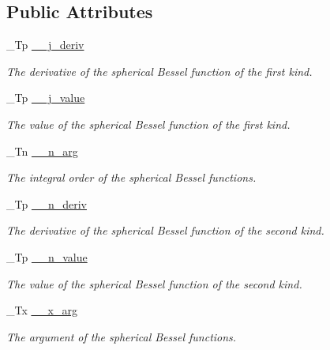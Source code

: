 \subsection*{Public Attributes}
\begin{DoxyCompactItemize}
\item 
\+\_\+\+Tp \hyperlink{struct____gnu__cxx_1_1____sph__bessel__t_af89f13e97d771e4cb18f69ea88056ee6}{\+\_\+\+\_\+j\+\_\+deriv}
\begin{DoxyCompactList}\small\item\em The derivative of the spherical Bessel function of the first kind. \end{DoxyCompactList}\item 
\+\_\+\+Tp \hyperlink{struct____gnu__cxx_1_1____sph__bessel__t_ace4d11f6823cddc49f8f9855298d9eac}{\+\_\+\+\_\+j\+\_\+value}
\begin{DoxyCompactList}\small\item\em The value of the spherical Bessel function of the first kind. \end{DoxyCompactList}\item 
\+\_\+\+Tn \hyperlink{struct____gnu__cxx_1_1____sph__bessel__t_a002325ca0f884fb872e1d211e7885d58}{\+\_\+\+\_\+n\+\_\+arg}
\begin{DoxyCompactList}\small\item\em The integral order of the spherical Bessel functions. \end{DoxyCompactList}\item 
\+\_\+\+Tp \hyperlink{struct____gnu__cxx_1_1____sph__bessel__t_a84247b0cc2295f300c523d85a3cc601f}{\+\_\+\+\_\+n\+\_\+deriv}
\begin{DoxyCompactList}\small\item\em The derivative of the spherical Bessel function of the second kind. \end{DoxyCompactList}\item 
\+\_\+\+Tp \hyperlink{struct____gnu__cxx_1_1____sph__bessel__t_ad846c3cb00bfabcbddc3e2f6512e3d7f}{\+\_\+\+\_\+n\+\_\+value}
\begin{DoxyCompactList}\small\item\em The value of the spherical Bessel function of the second kind. \end{DoxyCompactList}\item 
\+\_\+\+Tx \hyperlink{struct____gnu__cxx_1_1____sph__bessel__t_afa9cf4b1888081bd21716c58ed19719b}{\+\_\+\+\_\+x\+\_\+arg}
\begin{DoxyCompactList}\small\item\em The argument of the spherical Bessel functions. \end{DoxyCompactList}\end{DoxyCompactItemize}


